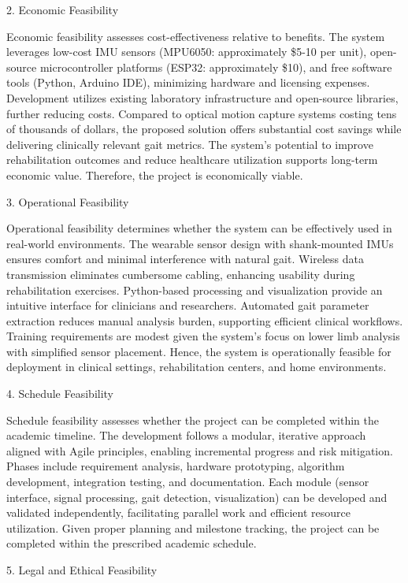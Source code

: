 \documentclass[12pt,a4paper]{report}
\begin{document}
2. Economic Feasibility

Economic feasibility assesses cost-effectiveness relative to benefits. The system leverages low-cost IMU sensors (MPU6050: approximately \$5-10 per unit), open-source microcontroller platforms (ESP32: approximately \$10), and free software tools (Python, Arduino IDE), minimizing hardware and licensing expenses. Development utilizes existing laboratory infrastructure and open-source libraries, further reducing costs. Compared to optical motion capture systems costing tens of thousands of dollars, the proposed solution offers substantial cost savings while delivering clinically relevant gait metrics. The system's potential to improve rehabilitation outcomes and reduce healthcare utilization supports long-term economic value. Therefore, the project is economically viable.

3. Operational Feasibility

Operational feasibility determines whether the system can be effectively used in real-world environments. The wearable sensor design with shank-mounted IMUs ensures comfort and minimal interference with natural gait. Wireless data transmission eliminates cumbersome cabling, enhancing usability during rehabilitation exercises. Python-based processing and visualization provide an intuitive interface for clinicians and researchers. Automated gait parameter extraction reduces manual analysis burden, supporting efficient clinical workflows. Training requirements are modest given the system's focus on lower limb analysis with simplified sensor placement. Hence, the system is operationally feasible for deployment in clinical settings, rehabilitation centers, and home environments.

4. Schedule Feasibility

Schedule feasibility assesses whether the project can be completed within the academic timeline. The development follows a modular, iterative approach aligned with Agile principles, enabling incremental progress and risk mitigation. Phases include requirement analysis, hardware prototyping, algorithm development, integration testing, and documentation. Each module (sensor interface, signal processing, gait detection, visualization) can be developed and validated independently, facilitating parallel work and efficient resource utilization. Given proper planning and milestone tracking, the project can be completed within the prescribed academic schedule.

5. Legal and Ethical Feasibility
\end{document}
